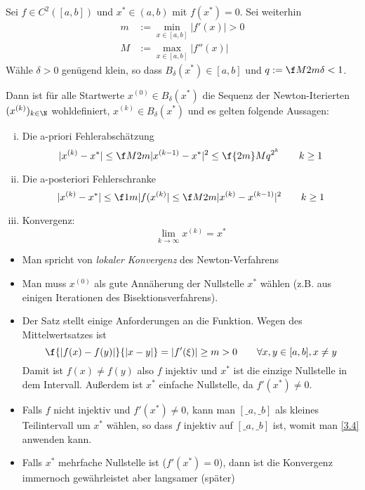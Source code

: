 \documentclass[11pt]{scrartcl}
\begin{document}
\begin{st} \label{3.4}
	Sei $f \in C^2([a,b])$ und $x^* \in (a,b)$ mit $f(x^*) = 0$.
	Sei weiterhin
	\begin{align*}
		m &:= \min_{x\in [a,b]}|f'(x)| > 0 \\
		M &:= \max_{x\in [a,b]}|f''(x)|
	\end{align*}
	Wähle $\delta > 0$ genügend klein, so dass $B_\delta (x^*) \in [a,b]$ und $q := \f M{2m} \delta < 1$.

	Dann ist für alle Startwerte $x^{(0)} \in B_\delta(x^*)$ die Sequenz der Newton-Iterierten $(x^{(k)})_{k\in \N}$ wohldefiniert, $x^{(k)} \in B_\delta(x^*)$ und es gelten folgende Aussagen:
	\begin{enumerate}[i)]
		\item
			Die a-priori Fehlerabschätzung
			\[
				|x^{(k)} - x^*| \le \f M{2m} |x^{(k-1)} - x^*|^2 \le \f {2m}M q^{2^k}
				\qquad k\ge 1
			\]
		\item
			Die a-posteriori Fehlerschranke
			\[
				|x^{(k)} - x^*| \le \f 1m |f(x^{(k)}| \le \f M{2m} |x^{(k)} - x^{(k-1)}|^2
				\qquad k\ge 1
			\]
		\item
			Konvergenz:
			\[
				\lim_{k\to \infty} x^{(k)} = x^*
			\]
	\end{enumerate}
	\begin{note}
		\begin{itemize}
			\item
				Man spricht von \emph{lokaler Konvergenz} des Newton-Verfahrens
			\item
				Man muss $x^{(0)}$ als gute Annäherung der Nullstelle $x^*$ wählen (z.B. aus einigen Iterationen des Bisektionsverfahrens).
			\item
				Der Satz stellt einige Anforderungen an die Funktion.
				Wegen des Mittelwertsatzes ist
				\[
					\f {|f(x) - f(y)|}{|x-y|} = |f'(\xi)| \ge m > 0
					\qquad \forall x,y \in [a,b], x \neq y
				\]
				Damit ist $f(x) \neq f(y)$ also $f$ injektiv und $x^*$ ist die einzige Nullstelle in dem Intervall.
				Außerdem ist $x^*$ einfache Nullstelle, da $f'(x^*) \neq 0$.
			\item
				Falls $f$ nicht injektiv und $f'(x^*) \neq 0$, kann man $[\_a, \_b]$ als kleines Teilintervall um $x^*$ wählen, so dass $f$ injektiv auf $[\_a,\_b]$ ist, womit man \ref{3.4} anwenden kann.
			\item
				Falls $x^*$ mehrfache Nullstelle ist ($f'(x^*)=0$), dann ist die Konvergenz immernoch gewährleistet aber langsamer (später)
		\end{itemize}

\end{note}
\end{st}
\end{document}

